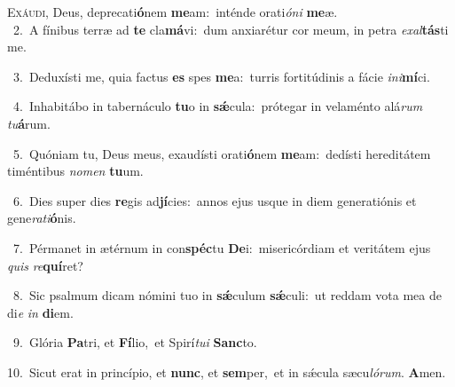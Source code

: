 \lettrine{\initial\textcolor{\initialcolor}{E}}{xáudi,} Deus, deprecati\-\textbf{ó}\-nem \textbf{me}\-am:~\star inténde orati\-\textit{ó}\-\textit{ni} \textbf{me}\-æ.\\
{\numbfont\textcolor{\numbcolor}{~2.}}~A fínibus terræ ad \textbf{te} cla\-\textbf{má}\-vi:~\star dum anxiarétur cor meum, in petra \textit{ex}\-\textit{al}\textbf{tás}ti me.\par
{\numbfont\textcolor{\numbcolor}{~3.}}~Deduxísti me, quia factus \textbf{es} spes \textbf{me}\-a:~\star turris fortitúdinis a fácie \textit{in}\-\textit{i}\textbf{mí}ci.\par
{\numbfont\textcolor{\numbcolor}{~4.}}~Inhabitábo in tabernáculo \textbf{tu}\-o in \textbf{sǽ}\-cula:~\star prótegar in velaménto alá\textit{rum} \textit{tu}\-\textbf{á}rum.\par
{\numbfont\textcolor{\numbcolor}{~5.}}~Quóniam tu, Deus meus, exaudísti orati\-\textbf{ó}\-nem \textbf{me}\-am:~\star dedísti hereditátem timéntibus \textit{no}\-\textit{men} \textbf{tu}\-um.\par
{\numbfont\textcolor{\numbcolor}{~6.}}~Dies super dies \textbf{re}\-gis ad\-\textbf{jí}\-cies:~\star annos ejus usque in diem generatiónis et gene\-\textit{ra}\-\textit{ti}\textbf{ó}nis.\par
{\numbfont\textcolor{\numbcolor}{~7.}}~Pérmanet in ætérnum in con\-\textbf{spéc}\-tu \textbf{De}\-i:~\star misericórdiam et veritátem ejus \textit{quis} \textit{re}\-\textbf{quí}ret?\par
{\numbfont\textcolor{\numbcolor}{~8.}}~Sic psalmum dicam nómini tuo in \textbf{sǽ}\-culum \textbf{sǽ}\-culi:~\star ut reddam vota mea de di\textit{e} \textit{in} \textbf{di}\-em.\par
{\numbfont\textcolor{\numbcolor}{~9.}}~Glória \textbf{Pa}\-tri, et \textbf{Fí}\-lio,~\star et Spirí\-\textit{tu}\-\textit{i} \textbf{Sanc}\-to.\par
{\numbfont\textcolor{\numbcolor}{10.}}~Sicut erat in princípio, et \textbf{nunc}\-, et \textbf{sem}\-per,~\star et in sǽcula sæcu\-\textit{ló}\-\textit{rum}. \textbf{A}\-men.\par
